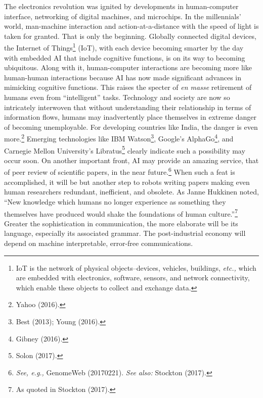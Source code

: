 \begin{multicols}{2}
The electronics revolution was ignited by developments in human-computer interface, networking of digital machines, and microchips. In the millennials' world, man-machine interaction and action-at-a-distance with the speed of light is taken for granted. That is only the beginning. Globally connected digital devices, the Internet of Things\footnote{IoT is the network of physical objects--devices, vehicles, buildings, \textit{etc.,} which are embedded with electronics, software, sensors, and network connectivity, which enable these objects to collect and exchange data.}  (IoT), with each device becoming smarter by the day with embedded AI that include cognitive functions, is on its way to becoming ubiquitous. Along with it, human-computer interactions are becoming more like human-human interactions because AI has now made significant advances in mimicking cognitive functions. This raises the specter of \textit{en masse} retirement of humans even from “intelligent” tasks. Technology and society are now so intricately interwoven that without understanding their relationship in terms of information flows, humans may inadvertently place themselves in extreme danger of becoming unemployable. For developing countries like India, the danger is even more.\footnote{Yahoo (2016).}  Emerging technologies like IBM Watson\footnote{Best (2013); Young (2016).}, Google's AlphaGo\footnote{Gibney (2016).}, and Carnegie Mellon University's Libratus\footnote{Solon (2017).} clearly indicate such a possibility may occur soon. On another important front, AI may provide an amazing service, that of peer review of scientific papers, in the near future.\footnote{\textit{See, e.g.,} GenomeWeb (20170221). \textit{See also:} Stockton (2017).}  When such a feat is accomplished, it will be but another step to robots writing papers making even human researchers redundant, inefficient, and obsolete. As Janne Hukkinen noted, “New knowledge which humans no longer experience as something they themselves have produced would shake the foundations of human culture.”\footnote{As quoted in Stockton (2017).}  Greater the sophistication in communication, the more elaborate will be its language, especially its associated grammar. The post-industrial economy will depend on machine interpretable, error-free communications.


\end{multicols}
